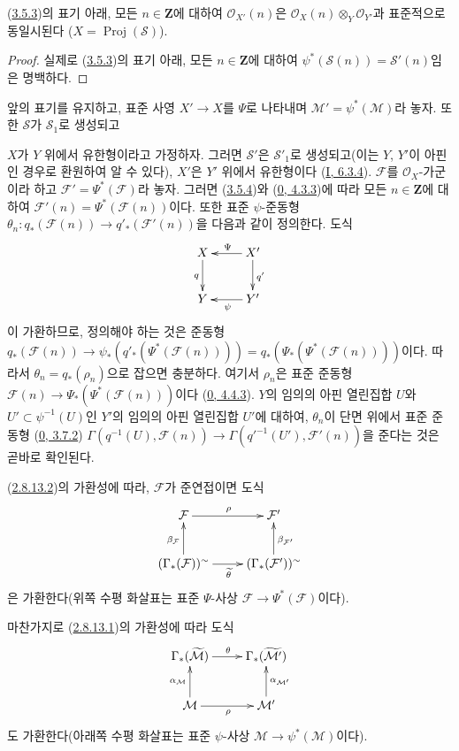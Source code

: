 \begin{corollary}[3.5.4]
\label{II.3.5.4-ko}
(\hyperref[II.3.5.3-ko]{3.5.3})의 표기 아래, 모든
$n\in\mathbf{Z}$에 대하여 $\mathcal{O}_{X'}(n)$은
$\mathcal{O}_X(n)\otimes_Y\mathcal{O}_{Y'}$과 표준적으로 동일시된다
($X=\operatorname{Proj}(\mathcal{S})$).
\end{corollary}

\begin{proof}
실제로 (\hyperref[II.3.5.3-ko]{3.5.3})의 표기 아래, 모든
$n\in\mathbf{Z}$에 대하여
$\psi^*(\mathcal{S}(n))=\mathcal{S}'(n)$임은 명백하다.
\end{proof}

\begin{env}[3.5.5]
\label{II.3.5.5-ko}
앞의 표기를 유지하고, 표준 사영 $X'\to X$를 $\Psi$로 나타내며
$\mathcal{M}'=\psi^*(\mathcal{M})$라 놓자. 또한 $\mathcal{S}$가
$\mathcal{S}_1$로 생성되고


$X$가 $Y$ 위에서 유한형이라고 가정하자. 그러면 $\mathcal{S}'$은
$\mathcal{S}'_1$로 생성되고(이는 $Y$, $Y'$이 아핀인 경우로 환원하여
알 수 있다), $X'$은 $Y'$ 위에서 유한형이다
(\hyperref[I.6.3.4-ko]{I, 6.3.4}). $\mathcal{F}$를
$\mathcal{O}_X$-가군이라 하고 $\mathcal{F}'=\Psi^*(\mathcal{F})$라
놓자. 그러면 (\hyperref[II.3.5.4-ko]{3.5.4})와
(\hyperref[0.4.3.3-ko]{0, 4.3.3})에 따라 모든 $n\in\mathbf{Z}$에
대하여 $\mathcal{F}'(n)=\Psi^*(\mathcal{F}(n))$이다. 또한 표준
$\psi$-준동형
$\theta_n:q_*(\mathcal{F}(n))\to q'_*(\mathcal{F}'(n))$을 다음과 같이
정의한다. 도식
\[
  \xymatrix{
    X\ar[d]_{q}
    & X'\ar[l]_{\Psi}\ar[d]^{q'}\\
    Y
    & Y'\ar[l]^{\psi}
  }
\]
이 가환하므로, 정의해야 하는 것은 준동형
$q_*(\mathcal{F}(n))\to
\psi_*(q'_*(\Psi^*(\mathcal{F}(n))))
=q_*(\Psi_*(\Psi^*(\mathcal{F}(n))))$이다. 따라서
$\theta_n=q_*(\rho_n)$으로 잡으면 충분하다. 여기서 $\rho_n$은 표준
준동형
$\mathcal{F}(n)\to\Psi_*(\Psi^*(\mathcal{F}(n)))$이다
(\hyperref[0.4.4.3-ko]{0, 4.4.3}). $Y$의 임의의 아핀 열린집합
$U$와 $U'\subset\psi^{-1}(U)$인 $Y'$의 임의의 아핀 열린집합 $U'$에
대하여, $\theta_n$이 단면 위에서 표준 준동형
(\hyperref[0.3.7.2-ko]{0, 3.7.2})
$\Gamma(q^{-1}(U),\mathcal{F}(n))\to
\Gamma(q'^{-1}(U'),\mathcal{F}'(n))$을 준다는 것은 곧바로 확인된다.

(\hyperref[II.2.8.13.2-ko]{2.8.13.2})의 가환성에 따라,
$\mathcal{F}$가 준연접이면 도식
\[
  \xymatrix{
    \mathcal{F}\ar[r]^{\rho}
    & \mathcal{F}'\\
    (\Gamma_*(\mathcal{F}))^{\sim}
      \ar[u]^{\beta_{\mathcal{F}}}\ar[r]_{\widetilde{\theta}}
    & (\Gamma_*(\mathcal{F}'))^{\sim}
      \ar[u]_{\beta_{\mathcal{F}'}}
  }
\]
은 가환한다(위쪽 수평 화살표는 표준 $\Psi$-사상
$\mathcal{F}\to\Psi^*(\mathcal{F})$이다).

마찬가지로 (\hyperref[II.2.8.13.1-ko]{2.8.13.1})의 가환성에 따라 도식
\[
  \xymatrix{
    \Gamma_*(\widetilde{\mathcal{M}})\ar[r]^{\theta}
    & \Gamma_*(\widetilde{\mathcal{M}'})\\
    \mathcal{M}\ar[r]_{\rho}\ar[u]^{\alpha_{\mathcal{M}}}
    & \mathcal{M}'\ar[u]_{\alpha_{\mathcal{M}'}}
  }
\]
도 가환한다(아래쪽 수평 화살표는 표준 $\psi$-사상
$\mathcal{M}\to\psi^*(\mathcal{M})$이다).
\end{env}

